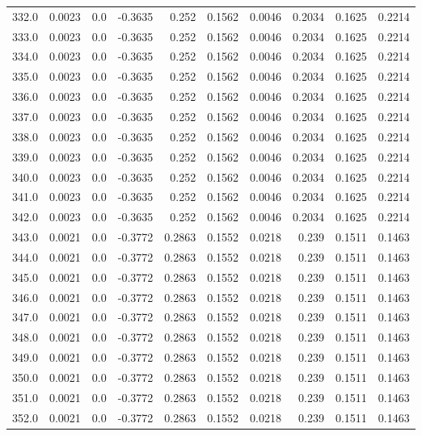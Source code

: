 \begin{longtable}{lrrrrrrrrr}
332.0 & 0.0023 & 0.0 & -0.3635 & 0.252 & 0.1562 & 0.0046 & 0.2034 & 0.1625 & 0.2214 \\
333.0 & 0.0023 & 0.0 & -0.3635 & 0.252 & 0.1562 & 0.0046 & 0.2034 & 0.1625 & 0.2214 \\
334.0 & 0.0023 & 0.0 & -0.3635 & 0.252 & 0.1562 & 0.0046 & 0.2034 & 0.1625 & 0.2214 \\
335.0 & 0.0023 & 0.0 & -0.3635 & 0.252 & 0.1562 & 0.0046 & 0.2034 & 0.1625 & 0.2214 \\
336.0 & 0.0023 & 0.0 & -0.3635 & 0.252 & 0.1562 & 0.0046 & 0.2034 & 0.1625 & 0.2214 \\
337.0 & 0.0023 & 0.0 & -0.3635 & 0.252 & 0.1562 & 0.0046 & 0.2034 & 0.1625 & 0.2214 \\
338.0 & 0.0023 & 0.0 & -0.3635 & 0.252 & 0.1562 & 0.0046 & 0.2034 & 0.1625 & 0.2214 \\
339.0 & 0.0023 & 0.0 & -0.3635 & 0.252 & 0.1562 & 0.0046 & 0.2034 & 0.1625 & 0.2214 \\
340.0 & 0.0023 & 0.0 & -0.3635 & 0.252 & 0.1562 & 0.0046 & 0.2034 & 0.1625 & 0.2214 \\
341.0 & 0.0023 & 0.0 & -0.3635 & 0.252 & 0.1562 & 0.0046 & 0.2034 & 0.1625 & 0.2214 \\
342.0 & 0.0023 & 0.0 & -0.3635 & 0.252 & 0.1562 & 0.0046 & 0.2034 & 0.1625 & 0.2214 \\
343.0 & 0.0021 & 0.0 & -0.3772 & 0.2863 & 0.1552 & 0.0218 & 0.239 & 0.1511 & 0.1463 \\
344.0 & 0.0021 & 0.0 & -0.3772 & 0.2863 & 0.1552 & 0.0218 & 0.239 & 0.1511 & 0.1463 \\
345.0 & 0.0021 & 0.0 & -0.3772 & 0.2863 & 0.1552 & 0.0218 & 0.239 & 0.1511 & 0.1463 \\
346.0 & 0.0021 & 0.0 & -0.3772 & 0.2863 & 0.1552 & 0.0218 & 0.239 & 0.1511 & 0.1463 \\
347.0 & 0.0021 & 0.0 & -0.3772 & 0.2863 & 0.1552 & 0.0218 & 0.239 & 0.1511 & 0.1463 \\
348.0 & 0.0021 & 0.0 & -0.3772 & 0.2863 & 0.1552 & 0.0218 & 0.239 & 0.1511 & 0.1463 \\
349.0 & 0.0021 & 0.0 & -0.3772 & 0.2863 & 0.1552 & 0.0218 & 0.239 & 0.1511 & 0.1463 \\
350.0 & 0.0021 & 0.0 & -0.3772 & 0.2863 & 0.1552 & 0.0218 & 0.239 & 0.1511 & 0.1463 \\
351.0 & 0.0021 & 0.0 & -0.3772 & 0.2863 & 0.1552 & 0.0218 & 0.239 & 0.1511 & 0.1463 \\
352.0 & 0.0021 & 0.0 & -0.3772 & 0.2863 & 0.1552 & 0.0218 & 0.239 & 0.1511 & 0.1463 \\

\end{longtable}
